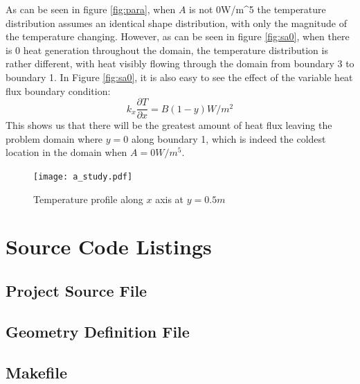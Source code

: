 \documentclass[letterpaper,10pt]{article}
\begin{document}
As can be seen in figure \ref{fig:para}, when $A$ is not \unit{0}{W/m^5} the temperature distribution assumes an identical shape distribution, with only the magnitude of the temperature changing. However, as can be seen in figure \ref{fig:sa0}, when there is 0 heat generation throughout the domain, the temperature distribution is rather different, with heat visibly flowing through the domain from boundary 3 to boundary 1. In Figure \ref{fig:sa0}, it is also easy to see the effect of the variable heat flux boundary condition:
\[k_x\frac{\partial T}{\partial x} = B \left(1-y\right) \unit{}{W/m^2}\]
\noindent This shows us that there will be the greatest amount of heat flux leaving the problem domain where $y=0$ along boundary 1, which is indeed the coldest location in the domain when $A=\unit{0}{W/m^5}$.

\begin{figure}[H]
	\centering
	\texttt{[image: a\_study.pdf]}
	\caption{Temperature profile along $x$ axis at $y=\unit{0.5}{m}$}
	\label{fig:a_study}
\end{figure}

\pagebreak
\appendix
\addappheadtotoc
\makeatletter
\def\@seccntformat#1{Appendix\ \csname the#1\endcsname:\ }
\makeatother
\renewcommand{\thepage}{\thesection-\arabic{page}}
\setcounter{page}{1}

\section{Source Code Listings}
\label{app:source}
\subsection{Project Source File}

\subsection{Geometry Definition File}

\subsection{Makefile}

\end{document}
